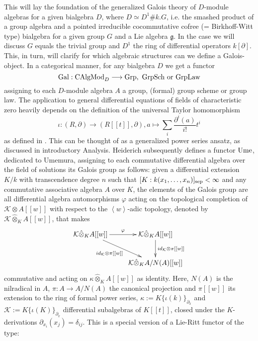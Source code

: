 \indent This will lay the foundation of the generalized Galois theory of $D$-module algebras for a given bialgebra $D$, where $D \simeq D^1 \# k.G$, i.e. the smashed product of a group algebra and a pointed irreducible cocommutative cofree (= Birkhoff-Witt type) bialgebra for a given group $G$ and a Lie algebra $\mathfrak{g}$. In the case we will discuss $G$ equals the trivial group and $D^1$ the ring of differential operators $k[\partial]$. This, in turn, will clarify for which algebraic structures can we define a Galois-object. In a categorical manner, for any bialgebra $D$ we get a functor
$$\trm{Gal} : \trm{CAlgMod}_D \longrightarrow \trm{Grp},\ \trm{GrpSch}\ \trm{or}\ \trm{GrpLaw}$$
assigning to each $D$-module algebra $A$ a group, (formal) group scheme or group law. The application to general differential equations of fields of characteristic zero heavily depends on the definition of the universal Taylor homomorphism
$$\iota: (R, \partial) \longrightarrow (R[[t]],\partial), a \longmapsto \sum_i \frac{\partial^i(a)}{i!} t^i$$
as defined in \cite{Ume96}. This can be thought of as a generalized power series ansatz, as discussed in introductory Analysis. Heiderich subsequently defines a functor $\mathrm{Ume}$, dedicated to Umemura, assigning to each commutative differential algebra over the field of solutions its Galois group as follows: given a differential extension $K/k$ with transcendence degree $n$ such that $[K : k(x_1,\ldots,x_n)]_{\mathrm{sep}} < \infty$ and any commutative associative algebra $A$ over $K$, the elements of the Galois group are all differential algebra automorphisms $\varphi$ %
 acting on the topological completion of $\mathcal{K} \otimes A[[w]]$ with respect to the $\left<w\right>$-adic topology, denoted by $\mathcal{K} \hat{\otimes}_K A[[w]]$, that makes
$$\xymatrix{
\mathcal{K} \hat{\otimes}_K A[[w]] \ar[r]^\varphi \ar[rd]_{id_{\mathcal{K}} \otimes \pi[[w]]~~~~} & \mathcal{K} \hat{\otimes}_K A[[w]]\ar[d]^{id_{\mathcal{K}} \otimes \pi[[w]]}\\
&\mathcal{K} \hat{\otimes}_K A/N(A)[[w]]\\
}$$
commutative and acting on $\kappa \hat{\otimes}_K A[[w]]$ as identity. Here, $N(A)$ is the nilradical in $A$, $\pi : A \longrightarrow A/N(A)$ the canonical projection and $\pi[[w]]$ its extension to the ring of formal power series, $\kappa := K\{\iota(k)\}_{\partial_x}$ and $\mathcal{K} := K\{\iota(K)\}_{\partial_x}$ differential subalgebras of $K[[t]]$, closed under the $K$-derivations $\partial_{x_i}(x_j) = \delta_{ij}$.  This is a special version of a Lie-Ritt functor of the type:
